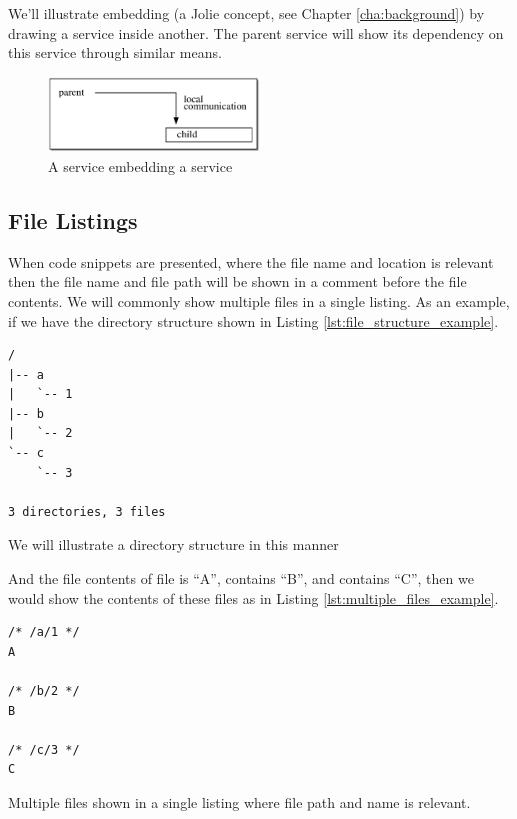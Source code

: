 We'll illustrate embedding (a Jolie concept, see Chapter \ref{cha:background})
by drawing a service inside another. The parent service will show its
dependency on this service through similar means.

\begin{figure}[H]

\centering
\includegraphics[width=0.5\textwidth]{introduction/embedding.eps}

\caption{A  service embedding a  service}

\label{fig:box_and_line_embedding}

\end{figure}

\subsection*{File Listings}

When code snippets are presented, where the file name and location is relevant
then the file name and file path will be shown in a comment before the file
contents. We will commonly show multiple files in a single listing.  As an
example, if we have the directory structure shown in Listing
\ref{lst:file_structure_example}.

\begin{listing}[H]
\begin{verbatim}
/
|-- a
|   `-- 1
|-- b
|   `-- 2
`-- c
    `-- 3

3 directories, 3 files
\end{verbatim}
\caption{We will illustrate a directory structure in this manner}
\label{lst:file_structure_example}
\end{listing}

And the file contents of file  is ``A'',  contains ``B'',
    and  contains ``C'', then we would show the contents of these
    files as in Listing \ref{lst:multiple_files_example}.

\begin{listing}[H]
\begin{verbatim}
/* /a/1 */
A

/* /b/2 */
B

/* /c/3 */
C
\end{verbatim}

\caption{Multiple files shown in a single listing where file path and name is
    relevant.}

\label{lst:multiple_files_example}
\end{listing}

